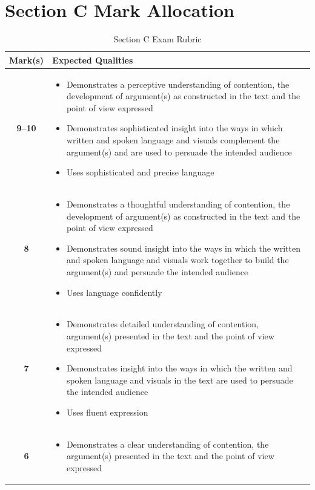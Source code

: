 \documentclass[a4paper]{article}
\begin{document}
\newpage
\section{Section C Mark Allocation}
\begin{longtable}{|c|p{13cm}|}
\caption{Section C Exam Rubric} \label{tab:sectionc}\\
\hline
\textbf{Mark(s)} & \textbf{Expected Qualities} \\
\hline
\textbf{9--10} & 
\begin{itemize}
  \item Demonstrates a perceptive understanding of contention, the development of argument(s) as constructed in the text and the point of view expressed
  \item Demonstrates sophisticated insight into the ways in which written and spoken language and visuals complement the argument(s) and are used to persuade the intended audience
  \item Uses sophisticated and precise language
\end{itemize} \\
\hline
\textbf{8} & 
\begin{itemize}
  \item Demonstrates a thoughtful understanding of contention, the development of argument(s) as constructed in the text and the point of view expressed
  \item Demonstrates sound insight into the ways in which the written and spoken language and visuals work together to build the argument(s) and persuade the intended audience
  \item Uses language confidently
\end{itemize} \\
\hline
\textbf{7} & 
\begin{itemize}
  \item Demonstrates detailed understanding of contention, argument(s) presented in the text and the point of view expressed
  \item Demonstrates insight into the ways in which the written and spoken language and visuals in the text are used to persuade the intended audience
  \item Uses fluent expression
\end{itemize} \\
\hline
\textbf{6} & 
\begin{itemize}
  \item Demonstrates a clear understanding of contention, the argument(s) presented in the text and the point of view expressed

\end{itemize}
\end{longtable}
\end{document}
